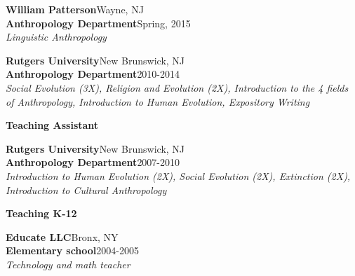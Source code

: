 \documentclass[letterpaper,11pt]{article}
\begin{document}
{{{{\begin{flushleft}
\end{flushleft}

\begin{flushleft}

\textbf{William Patterson}\hfill Wayne, NJ \\
\textbf{Anthropology Department}\hfill Spring, 2015\\
\vspace{1 mm}
\emph{Linguistic Anthropology}

\vspace{1mm}

\end{flushleft}

 \begin{flushleft}

\textbf{Rutgers University}\hfill New Brunswick, NJ \\
\textbf{Anthropology Department}\hfill 2010-2014\\
\vspace{1 mm}
\emph{Social Evolution (3X),  Religion and Evolution (2X), Introduction to the 4 fields of Anthropology, Introduction to Human Evolution, Expository Writing}

\vspace{1mm}

\end{flushleft}



\center
\large\textbf{Teaching Assistant}\\	
    \vspace{1 mm}
    
     \begin{flushleft}

\textbf{Rutgers University}\hfill New Brunswick, NJ \\
\textbf{Anthropology Department}\hfill 2007-2010\\
\vspace{1 mm}
\emph{Introduction to Human Evolution (2X), Social Evolution (2X), Extinction (2X), Introduction to Cultural Anthropology}

\vspace{1mm}

\end{flushleft}

\center
\large\textbf{Teaching K-12}	
    \vspace{1 mm}
    
\begin{flushleft}

\textbf{Educate LLC}\hfill Bronx, NY \\
\textbf{Elementary school}\hfill 2004-2005\\
\vspace{1 mm}
\emph{Technology and math teacher}


\end{flushleft}}}}}
\end{document}
